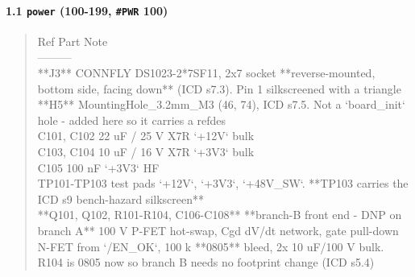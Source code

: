 \documentclass[11pt,a4paper]{article}
\begin{document}
\paragraph*{1.1 \texttt{power} (100-199, \texttt{\#PWR} 100)}
\begin{quote}\small\ttfamily\raggedright
\textbar{} Ref \textbar{} Part \textbar{} Note \textbar{}\\
\textbar{}---\textbar{}---\textbar{}---\textbar{}\\
\textbar{} {*}{*}J3{*}{*} \textbar{} CONNFLY DS1023-2{*}7SF11, 2x7 socket \textbar{} {*}{*}reverse-mounted, bottom side, facing down{*}{*} (ICD s7.3). Pin 1 silkscreened with a triangle \textbar{}\\
\textbar{} {*}{*}H5{*}{*} \textbar{} MountingHole\_3.2mm\_M3 \textbar{} (46, 74), ICD s7.5. Not a `board\_init` hole - added here so it carries a refdes \textbar{}\\
\textbar{} C101, C102 \textbar{} 22 uF / 25 V X7R \textbar{} `+12V` bulk \textbar{}\\
\textbar{} C103, C104 \textbar{} 10 uF / 16 V X7R \textbar{} `+3V3` bulk \textbar{}\\
\textbar{} C105 \textbar{} 100 nF \textbar{} `+3V3` HF \textbar{}\\
\textbar{} TP101-TP103 \textbar{} test pads \textbar{} `+12V`, `+3V3`, `+48V\_SW`. {*}{*}TP103 carries the ICD s9 bench-hazard silkscreen{*}{*} \textbar{}\\
\textbar{} {*}{*}Q101, Q102, R101-R104, C106-C108{*}{*} \textbar{} {*}{*}branch-B front end - DNP on branch A{*}{*} \textbar{} 100 V P-FET hot-swap, Cgd dV/dt network, gate pull-down N-FET from `/EN\_OK`, 100 k {*}{*}0805{*}{*} bleed, 2x 10 uF/100 V bulk. R104 is 0805 now so branch B needs no footprint change (ICD s5.4) \textbar{}
\end{quote}
\end{document}
